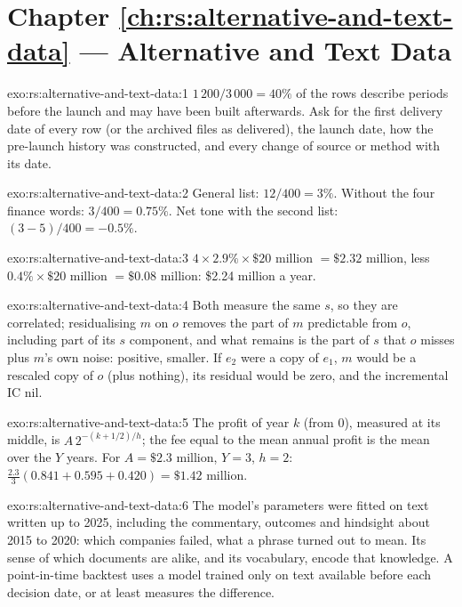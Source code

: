 \section*{Chapter \ref{ch:rs:alternative-and-text-data} --- Alternative and Text Data}

\begin{solution}{exo:rs:alternative-and-text-data:1}
$1\,200/3\,000 = 40\%$ of the rows describe periods before the launch and may have been built afterwards. Ask for the first delivery date of
every row (or the archived files as delivered), the launch date, how the pre-launch history was constructed, and every change of source or
method with its date.
\end{solution}

\begin{solution}{exo:rs:alternative-and-text-data:2}
General list: $12/400 = 3\%$. Without the four finance words: $3/400 = 0.75\%$. Net tone with the second list: $(3 - 5)/400 = -0.5\%$.
\end{solution}

\begin{solution}{exo:rs:alternative-and-text-data:3}
$4 \times 2.9\% \times \$20$ million $= \$2.32$ million, less $0.4\% \times \$20$ million $= \$0.08$ million: \$2.24 million a year.
\end{solution}

\begin{solution}{exo:rs:alternative-and-text-data:4}
Both measure the same $s$, so they are correlated; residualising $m$ on $o$ removes the part of $m$ predictable from $o$, including part of
its $s$ component, and what remains is the part of $s$ that $o$ misses plus $m$'s own noise: positive, smaller. If $e_2$ were a copy of $e_1$,
$m$ would be a rescaled copy of $o$ (plus nothing), its residual would be zero, and the incremental IC nil.
\end{solution}

\begin{solution}{exo:rs:alternative-and-text-data:5}
The profit of year $k$ (from 0), measured at its middle, is $A\,2^{-(k+1/2)/h}$; the fee equal to the mean annual profit is the mean over the
$Y$ years. For $A = \$2.3$ million, $Y = 3$, $h = 2$: $\frac{2.3}{3}(0.841 + 0.595 + 0.420) = \$1.42$ million.
\end{solution}

\begin{solution}{exo:rs:alternative-and-text-data:6}
The model's parameters were fitted on text written up to 2025, including the commentary, outcomes and hindsight about 2015 to 2020: which
companies failed, what a phrase turned out to mean. Its sense of which documents are alike, and its vocabulary, encode that knowledge. A
point-in-time backtest uses a model trained only on text available before each decision date, or at least measures the difference.
\end{solution}

